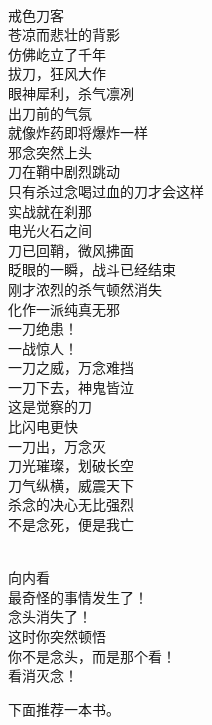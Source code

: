 \begin{poem}[觉·刀]
    \begin{multicols}{3}
        \centering~\\
        戒色刀客 \\ 苍凉而悲壮的背影 \\ 仿佛屹立了千年 \\ 拔刀，狂风大作 \\ 眼神犀利，杀气凛冽 \\ 出刀前的气氛 \\ 就像炸药即将爆炸一样 \\ 邪念突然上头 \\ 刀在鞘中剧烈跳动 \\ 只有杀过念喝过血的刀才会这样 \\ 实战就在刹那 \\ 电光火石之间 \\ 刀已回鞘，微风拂面 \\ 眨眼的一瞬，战斗已经结束 \\ 刚才浓烈的杀气顿然消失 \\ 化作一派纯真无邪 \\ 一刀绝患！ \\ 一战惊人！ \\ 一刀之威，万念难挡 \\ 一刀下去，神鬼皆泣 \\ 这是觉察的刀 \\ 比闪电更快 \\ 一刀出，万念灭 \\ 刀光璀璨，划破长空 \\ 刀气纵横，威震天下 \\ 杀念的决心无比强烈 \\ 不是念死，便是我亡
    \end{multicols}
\end{poem}

\begin{poem}[那个看]
    \begin{multicols}{3}
        \centering~\\
        向内看 \\ 最奇怪的事情发生了！ \\ 念头消失了！ \\ 这时你突然顿悟 \\ 你不是念头，而是那个看！ \\ 看消灭念！
    \end{multicols}
\end{poem}

下面推荐一本书。

